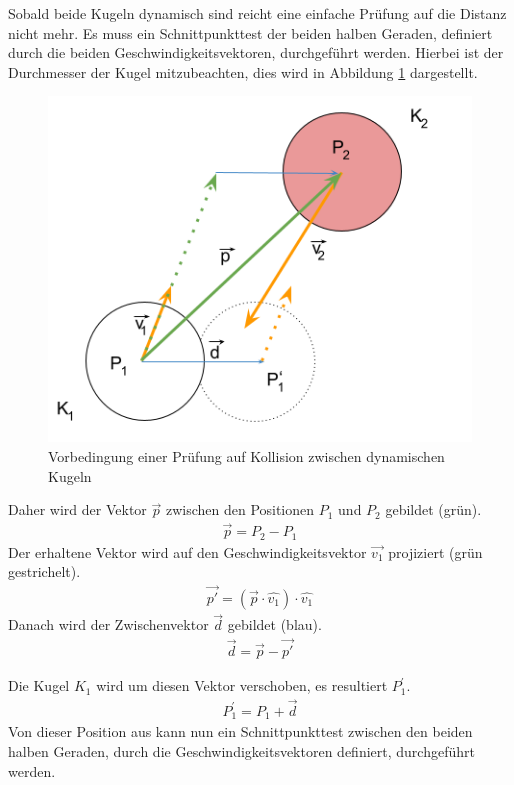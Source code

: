 Sobald beide Kugeln dynamisch sind reicht eine einfache Prüfung auf die Distanz nicht mehr. Es muss ein Schnittpunkttest der beiden halben Geraden, definiert durch die
beiden Geschwindigkeitsvektoren, durchgeführt werden. Hierbei ist der Durchmesser der Kugel mitzubeachten, dies
wird in Abbildung \ref{fig:kugelkollision_vorbedingung_dynamisch} dargestellt.
\begin{figure}[h!]
    \begin{center}
        \includegraphics[width=0.4\linewidth]{../common/03_billiard_ai/resources/25_vorbedingung_kugelkollision_dynamisch.png}
    \end{center}
    \caption{Vorbedingung einer Prüfung auf Kollision zwischen dynamischen Kugeln}
    \label{fig:kugelkollision_vorbedingung_dynamisch}
\end{figure}

Daher wird der Vektor $\vec{p}$ zwischen den Positionen $P_1$ und $P_2$ gebildet (grün).
\begin{align}
    \vec{p} = P_2 - P_1
\end{align}
Der erhaltene Vektor wird auf den Geschwindigkeitsvektor $\vec{v_1}$ projiziert (grün gestrichelt).
\begin{align}
    \vec{p'} = (\vec{p} \cdot \hat{v_1}) \cdot \hat{v_1}
\end{align}
Danach wird der Zwischenvektor $\vec{d}$ gebildet (blau).
\begin{align}
    \vec{d} = \vec{p} - \vec{p'}
\end{align}

Die Kugel $K_1$ wird um diesen Vektor verschoben, es resultiert $P^{'}_1$.
\begin{align}
    P^{'}_1 = P_1 + \vec{d}
\end{align}
Von dieser Position aus kann nun ein Schnittpunkttest zwischen den beiden
halben Geraden, durch die Geschwindigkeitsvektoren definiert, durchgeführt werden.

